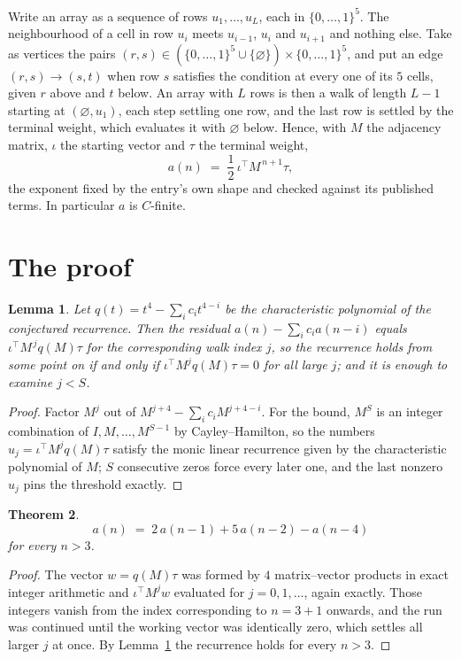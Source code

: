 \documentclass[11pt,a4paper]{article}
\theoremstyle{plain}
\newtheorem{theorem}{Theorem}
\newtheorem{lemma}[theorem]{Lemma}
\theoremstyle{definition}
\begin{document}
Write an array as a sequence of rows $u_1,\dots,u_L$, each in
$\{0,\dots,1\}^{5}$. The neighbourhood of a cell in row $u_i$ meets $u_{i-1}$,
$u_i$ and $u_{i+1}$ and nothing else. Take as vertices the pairs
$(r,s)\in(\{0,\dots,1\}^{5}\cup\{\varnothing\})\times\{0,\dots,1\}^{5}$,
and put an edge $(r,s)\to(s,t)$ when row $s$ satisfies the condition at every one of its
$5$ cells, given $r$ above and $t$ below. An array with $L$ rows is then a walk of length
$L-1$ starting at $(\varnothing,u_1)$, each step settling one row, and the last row is
settled by the terminal weight, which evaluates it with $\varnothing$ below. Hence,
with $M$ the adjacency matrix, $\iota$ the starting vector and $\tau$ the terminal weight,
\[
a(n)\;=\;\frac{1}{2}\,\iota^{\!\top}M^{\,n+1}\tau ,
\]
the exponent fixed by the entry's own shape and checked against its published terms. In
particular $a$ is $C$-finite.

\section{The proof}

\begin{lemma}\label{lem:crit}
Let $q(t)=t^{4}-\sum_i c_it^{4-i}$ be the characteristic polynomial of the
conjectured recurrence. Then the residual $a(n)-\sum_ic_ia(n-i)$ equals
$\iota^{\!\top}M^{\,j}q(M)\tau$ for the corresponding walk index $j$, so the
recurrence holds from some point on if and only if $\iota^{\!\top}M^{j}q(M)\tau=0$ for all
large $j$; and it is enough to examine $j<S$.
\end{lemma}

\begin{proof}
Factor $M^{j}$ out of $M^{j+4}-\sum_ic_iM^{j+4-i}$. For the bound, $M^{S}$
is an integer combination of $I,M,\dots,M^{S-1}$ by Cayley--Hamilton, so the numbers
$u_j=\iota^{\!\top}M^{j}q(M)\tau$ satisfy the monic linear recurrence given by the
characteristic polynomial of $M$; $S$ consecutive zeros force every later one, and the last
nonzero $u_j$ pins the threshold exactly.
\end{proof}

\begin{theorem}
\[
a(n)\;=\;2\,a(n-1) + 5\,a(n-2) - a(n-4)
\]
for every $n>3$.
\end{theorem}

\begin{proof}
The vector $w=q(M)\tau$ was formed by $4$ matrix--vector products in exact integer
arithmetic and $\iota^{\!\top}M^{j}w$ evaluated for $j=0,1,\dots$, again exactly. Those
integers vanish from the index corresponding to $n=3+1$ onwards, and the run was
continued until the working vector was identically zero, which settles all larger $j$ at once.
By Lemma~\ref{lem:crit} the recurrence holds for every $n>3$.
\end{proof}
\end{document}
